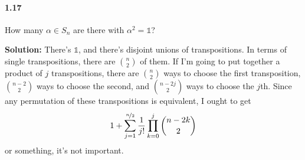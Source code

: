 \documentclass[12pt,a4paper]{article}
\providecommand{\id}{\mathbb{1}}
\begin{document}
\paragraph*{1.17}
How many $\alpha \in S_n$ are there with $\alpha^2 = \id$?

\textbf{Solution: } There's $\id$, and there's disjoint unions of transpositions. 
In terms of single transpositions, there are ${n \choose 2}$ of them. 
If I'm going to put together a product of $j$ transpositions, there are ${n \choose 2}$ ways to choose the first transposition, ${{n-2} \choose 2}$ ways to choose the second, and ${{n-2j} \choose 2}$ ways to choose the $j$th. Since any permutation of these transpositions is equivalent, I ought to get
\begin{equation*}
1 + \sum_{j=1}^{\nicefrac{n}{2}} \dfrac{1}{j!} \prod_{k=0}^{j} {{n-2k} \choose 2}
\end{equation*}
or something, it's not important.
\end{document}
